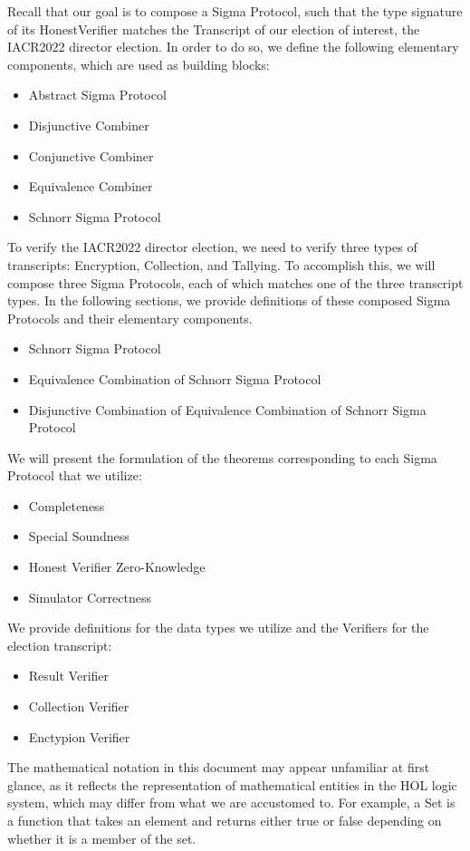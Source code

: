 Recall that our goal is to compose a Sigma Protocol, such that the type signature of its HonestVerifier matches 
the Transcript of our election of interest, the IACR2022 director election. In order to do so, we define the 
following elementary components, which are used as building blocks:
\begin{itemize}
    \item Abstract Sigma Protocol
    \item Disjunctive Combiner
    \item Conjunctive Combiner
    \item Equivalence Combiner
    \item Schnorr Sigma Protocol
\end{itemize}
To verify the IACR2022 director election, we need to verify three types of transcripts: Encryption, Collection, 
and Tallying. To accomplish this, we will compose three Sigma Protocols, each of which matches one of the three 
transcript types. In the following sections, we provide definitions of these composed Sigma Protocols and their 
elementary components.
\begin{itemize}
    \item Schnorr Sigma Protocol
    \item Equivalence Combination of Schnorr Sigma Protocol
    \item Disjunctive Combination of Equivalence Combination of Schnorr Sigma Protocol
\end{itemize}
We will present the formulation of the theorems corresponding to each Sigma Protocol that we utilize:
\begin{itemize}
    \item Completeness
    \item Special Soundness
    \item Honest Verifier Zero-Knowledge
    \item Simulator Correctness
\end{itemize}
We provide definitions for the data types we utilize and the Verifiers for the election transcript:
\begin{itemize}
    \item Result Verifier
    \item Collection Verifier
    \item Enctypion Verifier
\end{itemize}

The mathematical notation in this document may appear unfamiliar at 
first glance, as it reflects the representation of mathematical entities in the HOL logic system, which may 
differ from what we are accustomed to. For example, a Set is a function that takes an element and returns 
either true or false depending on whether it is a member of the set.
\newpage
